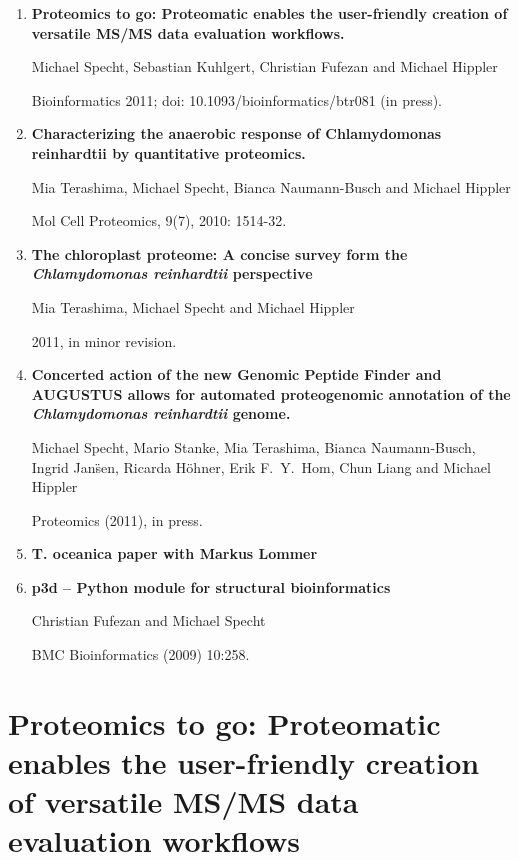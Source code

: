 \documentclass[11pt,a4paper,twoside]{report}
\begin{document}
\begin{enumerate}
\item 
{\bf Proteomics to go: Proteomatic enables the user-friendly creation of versatile MS/MS data evaluation workflows.}

Michael Specht, Sebastian Kuhlgert, Christian Fufezan and Michael Hippler

Bioinformatics 2011; doi: 10.1093/bioinformatics/btr081 (in press).

\item
{\bf Characterizing the anaerobic response of Chlamydomonas reinhardtii by quantitative proteomics.}

Mia Terashima, Michael Specht, Bianca Naumann-Busch and Michael Hippler

Mol Cell Proteomics, 9(7), 2010: 1514-32.

\item
{\bf The chloroplast proteome: A concise survey form the {\em Chlamydomonas reinhardtii} perspective}

Mia Terashima, Michael Specht and Michael Hippler

2011, in minor revision.

\item
{\bf Concerted action of the new Genomic Peptide Finder and AUGUSTUS allows for automated proteogenomic annotation of the {\em Chlamydomonas reinhardtii} genome.}

Michael Specht, Mario Stanke, Mia Terashima, Bianca Naumann-Busch, Ingrid Jan\"sen, Ricarda H\"ohner, Erik F.~Y.~Hom, Chun Liang and Michael Hippler

Proteomics (2011), in press.

\item
{\bf T. oceanica paper with Markus Lommer}

\item
{\bf p3d -- Python module for structural bioinformatics}

Christian Fufezan and Michael Specht

BMC Bioinformatics (2009) 10:258.

\end{enumerate}

\cleardoublepage
\section{Proteomics to go: Proteomatic enables the user-friendly creation of versatile MS/MS data evaluation workflows}
\end{document}

